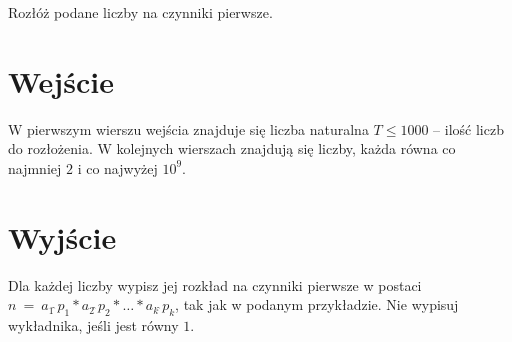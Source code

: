 \documentclass{spiral-kurs}
\begin{document}
\makeheader
%
  
Rozłóż podane liczby na czynniki pierwsze.

    \section{Wejście}
    W pierwszym wierszu wejścia znajduje się liczba naturalna $T \leq 1000$ -- ilość liczb do rozłożenia. W kolejnych wierszach znajdują się liczby, 
    każda równa co najmniej $2$ i co najwyżej $10^9$.
      
    \section{Wyjście}

Dla każdej liczby wypisz jej rozkład na czynniki pierwsze w postaci\\
$n\ =\ a_1 \hat{\ } p_1*a_2\hat{\ }p_2 * \ldots * a_k \hat{\ } p_k$, tak jak w podanym przykładzie. Nie wypisuj wykładnika, jeśli jest równy $1$.

  
\end{document}

